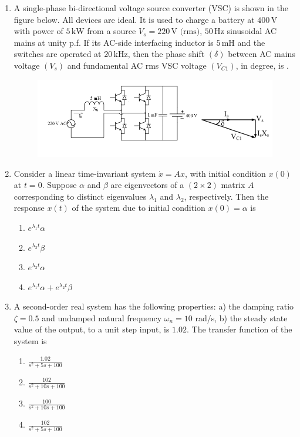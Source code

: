 \documentclass[journal,12pt,onecolumn]{IEEEtran}
\theoremstyle{remark}
\begin{document}
\begin{enumerate}[start=1, label=Q.\arabic*]
    \item A single-phase bi-directional voltage source converter (VSC) is shown in the figure below. 
All devices are ideal. It is used to charge a battery at $400\,\text{V}$ with power of $5\,\text{kW}$ 
from a source $V_s = 220\,\text{V (rms)}$, $50\,\text{Hz}$ sinusoidal AC mains at unity p.f. 
If its AC-side interfacing inductor is $5\,\text{mH}$ and the switches are operated at $20\,\text{kHz}$, 
then the phase shift $(\delta)$ between AC mains voltage $(V_s)$ and fundamental AC rms VSC voltage $(V_{C1})$, 
in degree, is \underline{\hspace{2cm}}.
\begin{figure}[H]
        \includegraphics[width=0.6\columnwidth]{Figures/2q48.png}
        \centering
        \caption{}
    \end{figure}
    

    \hfill{}

    \item Consider a linear time-invariant system $\dot{x}=Ax$, with initial condition $x(0)$ at $t=0$.
Suppose $\alpha$ and $\beta$ are eigenvectors of a $(2\times2)$ matrix $A$ corresponding to
distinct eigenvalues $\lambda_1$ and $\lambda_2$, respectively. Then the response $x(t)$ of the
system due to initial condition $x(0)=\alpha$ is
    \begin{enumerate}
            \item $e^{\lambda_1 t}\alpha$
            \item $e^{\lambda_2 t}\beta$
            \item $e^{\lambda_2 t}\alpha$
            \item $e^{\lambda_1 t}\alpha + e^{\lambda_2 t}\beta$
    \end{enumerate}

    \hfill{}

    \item A second-order real system has the following properties:
    a) the damping ratio $\zeta = 0.5$ and undamped natural frequency $\omega_n=10$ rad/s,
    b) the steady state value of the output, to a unit step input, is $1.02$.
    The transfer function of the system is
    \begin{enumerate}
            \item $\frac{1.02}{s^2+5s+100}$
            \item $\frac{102}{s^2+10s+100}$
            \item $\frac{100}{s^2+10s+100}$
            \item $\frac{102}{s^2+5s+100}$
    \end{enumerate}


\end{enumerate}
\end{document}
